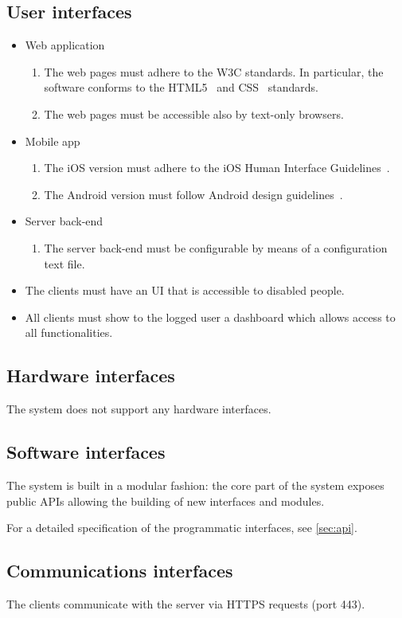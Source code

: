 \subsection{User interfaces}

\begin{itemize}
    \item Web application
        \begin{enumerate}
        \item The web pages must adhere to the W3C standards. In particular, the software conforms to the HTML5~\cite{w3c-html5} and CSS~\cite{w3c-css} standards.
        \item The web pages must be accessible also by text-only browsers.
        \end{enumerate}
    \item Mobile app
        \begin{enumerate}
        	\item The iOS version must adhere to the iOS Human Interface Guidelines~\cite{apple-ios-hig}.
	\item The Android version must follow Android design guidelines~\cite{google-android-hig}.
        \end{enumerate}
     \item Server back-end
     	\begin{enumerate}
		\item The server back-end must be configurable by means of a configuration text file.
	\end{enumerate}
	\item The clients must have an UI that is accessible to disabled people.
	\item All clients must show to the logged user a dashboard which allows access to all functionalities.
\end{itemize}

\subsection{Hardware interfaces}

The system does not support any hardware interfaces.

\subsection{Software interfaces}
The system is built in a modular fashion: the core part of the system exposes public APIs allowing the building of new interfaces and modules.

For a detailed specification of the programmatic interfaces, see \autoref{sec:api}.

\subsection{Communications interfaces}
The clients communicate with the server via HTTPS requests (port 443).